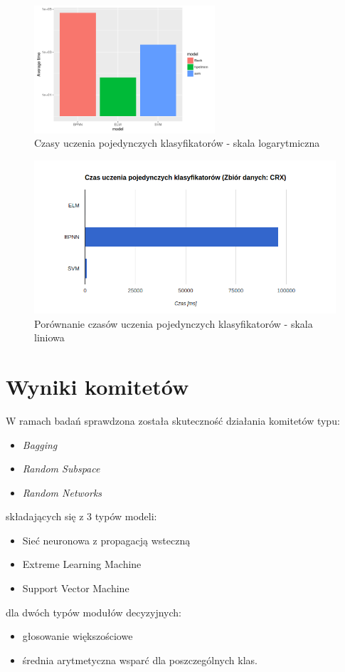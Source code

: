 \documentclass[11pt, a4paper, titlepage]{report}
\begin{document}
\begin{figure}[H]
	\includegraphics[width=0.6\textwidth]{base_classifier_time}
    \centering
    \caption{Czasy uczenia pojedynczych klasyfikatorów - skala logarytmiczna}
    \label{fig:base_classifiers_time}
\end{figure}

\begin{figure}[H]
	\includegraphics[width=1.0\textwidth]{wykres-czas}
    \centering
    \caption{Porównanie czasów uczenia pojedynczych klasyfikatorów - skala liniowa}
    \label{fig:time}
\end{figure}

\section{Wyniki komitetów}

W ramach badań sprawdzona została skuteczność działania komitetów typu: 
\begin{itemize}
\item \textit{Bagging}
\item \textit{Random Subspace}
\item \textit{Random Networks} 
\end{itemize}
składających się z 3 typów modeli: 
\begin{itemize}
\item Sieć neuronowa z propagacją wsteczną
\item Extreme Learning Machine
\item Support Vector Machine
\end{itemize}
dla dwóch typów modułów decyzyjnych:
\begin{itemize}
\item głosowanie większościowe
\item średnia arytmetyczna wsparć dla poszczególnych klas.
\end{itemize}
\end{document}
